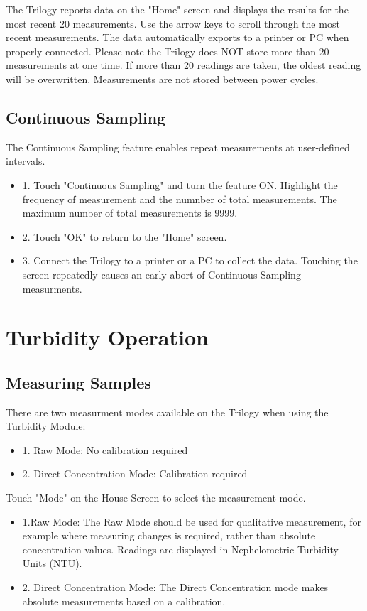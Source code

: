 \documentclass[12pt]{../SOP3_beta}\usepackage[]{graphicx}\usepackage[]{color}
\begin{document}
\NP The Trilogy reports data on the "Home" screen and displays the results for the most recent 20 measurements. Use the arrow keys to scroll through the most recent measurements. The data automatically exports to a printer or PC when properly connected. Please note the Trilogy does NOT store more than 20 measurements at one time. If more than 20 readings are taken, the oldest reading will be overwritten. Measurements are not stored between power cycles.

\subsection{Continuous Sampling}
\NP The Continuous Sampling feature enables repeat measurements at user-defined intervals.
\begin{itemize}
  \item 1. Touch "Continuous Sampling" and turn the feature ON. Highlight the frequency of measurement and the numnber of total measurements. The maximum number of total measurements is 9999.
  \item 2. Touch "OK" to return to the "Home" screen.
  \item 3. Connect the Trilogy to a printer or a PC to collect the data. Touching the screen repeatedly causes an early-abort of Continuous Sampling measurments. 
\end{itemize}

\section{Turbidity Operation}
\subsection{Measuring Samples}
\NP There are two measurment modes available on the Trilogy when using the Turbidity Module:
\begin{itemize}
  \item 1. Raw Mode: No calibration required
  \item 2. Direct Concentration Mode: Calibration required
\end{itemize}

\NP Touch "Mode" on the House Screen to select the measurement mode.
\begin{itemize}
  \item 1.Raw Mode: The Raw Mode should be used for qualitative measurement, for example where measuring changes is required, rather than absolute concentration values. Readings are displayed in Nephelometric Turbidity Units (NTU).
  \item 2. Direct Concentration Mode: The Direct Concentration mode makes absolute measurements based on a calibration.
\end{itemize}
\end{document}
